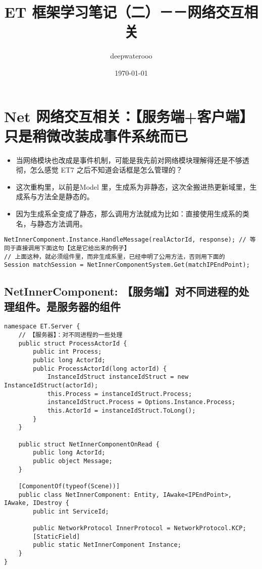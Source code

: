 \documentclass[9pt, b5paper]{article}
\author{deepwaterooo}
\date{\today}
\title{ET 框架学习笔记（二）－－网络交互相关}
\begin{document}
\maketitle
\tableofcontents


\section{Net 网络交互相关：【服务端+客户端】只是稍微改装成事件系统而已}
\label{sec-1}
\begin{itemize}
\item 当网络模块也改成是事件机制，可能是我先前对网络模块理解得还是不够透彻，怎么感觉 ET7 之后不知道会话框是怎么管理的？
\item 这次重构里，以前是Model 里，生成系为非静态，这次全搬进热更新域里，生成系与方法全是静态的。
\item 因为生成系全变成了静态，那么调用方法就成为比如：直接使用生成系的类名，与静态方法调用。
\end{itemize}
\begin{verbatim}
NetInnerComponent.Instance.HandleMessage(realActorId, response); // 等同于直接调用下面这句【这是它给出来的例子】
// 上面这种，就必须组件里，而非生成系里，已经申明了公用方法，否则用下面的
Session matchSession = NetInnerComponentSystem.Get(matchIPEndPoint);
\end{verbatim}
\subsection{NetInnerComponent: 【服务端】对不同进程的处理组件。是服务器的组件}
\label{sec-1-1}
\begin{verbatim}
namespace ET.Server {
    // 【服务器】：对不同进程的一些处理
    public struct ProcessActorId {
        public int Process;
        public long ActorId;
        public ProcessActorId(long actorId) {
            InstanceIdStruct instanceIdStruct = new InstanceIdStruct(actorId);
            this.Process = instanceIdStruct.Process;
            instanceIdStruct.Process = Options.Instance.Process;
            this.ActorId = instanceIdStruct.ToLong();
        }
    }
    
    public struct NetInnerComponentOnRead {
        public long ActorId;
        public object Message;
    }
    
    [ComponentOf(typeof(Scene))]
    public class NetInnerComponent: Entity, IAwake<IPEndPoint>, IAwake, IDestroy {
        public int ServiceId;
        
        public NetworkProtocol InnerProtocol = NetworkProtocol.KCP;
        [StaticField]
        public static NetInnerComponent Instance;
    }
}
\end{verbatim}
\end{document}
